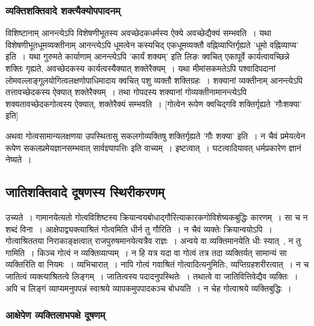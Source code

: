 			\subsubsection{व्यक्तिशक्तिवादे शक्त्यैक्योपपादनम्}

				विशिष्टानाम् आनन्त्येऽपि विशेषणीभूतस्य अवच्छेदकधर्मस्य ऐक्ये अवच्छेद्यैक्यं सम्भवति~। यथा विशेषणीभूतधूमव्यक्तीनाम् आनन्त्येऽपि धूमत्वेन कस्यचिद् एकधूमव्यक्तौ वह्निव्याप्तिर्गृह्यते 'धूमो वह्निव्याप्य' इति~। यथा गुरुमते कार्याणाम् आनन्त्येऽपि 'कार्यं शक्यम्' इति लिङः क्वचित् एकापूर्वे कार्यत्वावच्छिन्ने शक्तिः गृह्यते, अवच्छेदकस्य कार्यत्वस्यैक्यात् शक्तेरैक्यम्~। यथा मीमांसकमतेऽपि पश्वादिपदानां लोमवल्लाङ्गूलयोगित्वलक्षणोपाधिमादाय क्वचित् पशु व्यक्तौ शक्तिग्रहः~। शक्यानां व्यक्तीनाम् आनन्त्येऽपि तत्तावच्छेदकस्य ऐक्यात् शक्तेरैक्यम्~। तथा गोपदस्य शक्यानां गोव्यक्तीनामानन्त्येऽपि शक्यतावच्छेदकगोत्वस्य ऐक्यात्, शक्तेरैक्यं सम्भवति~। [गोत्वेन रूपेण क्वचिद्गवि शक्तिर्गृह्यते 'गौःशक्या' इति] 

				अथवा गोत्वसामान्यलक्षणया उपस्थितासु सकलगोव्यक्तिषु शक्तिर्गृह्यते 'गौः शक्या' इति~। न चैवं प्रमेयत्वेन रूपेण सकलप्रमेयज्ञानसम्भवात् सार्वज्ञ्यापत्तिः इति वाच्यम्~। इष्टत्वात्~। घटत्वादियावत्  धर्मप्रकारेण ज्ञानं नेष्यते~।

		\subsection{जातिशक्तिवादे दूषणस्य स्थिरीकरणम्}

			\begin{small}
				
				उच्यते~। गामानयेत्यतो गोत्वविशिष्टस्य क्रियान्वयबोधाद्गौरित्याकारकगोविशेष्यकबुद्धिः कारणम्~। सा च न शब्दं विना~। आक्षेपाद्व्यक्त्याश्रितं गोत्वमिति धीर्न तु गौरिति~। न चैवं व्यक्तेः क्रियान्वयोऽपि~। गोत्वाश्रिततया निराकाङ्क्षत्वात् राजपुरुषमानयेत्यत्रैव राज्ञः~। अन्वये वा व्यक्तिमानयेति धीः स्यात्~, न तु गामिति~। किञ्च गोत्वं न व्यक्तिव्याप्यम्~। न हि यत्र यदा वा गोत्वं तत्र तदा व्यक्तिर्यत् सामान्यं सा व्यक्तिरिति वा नियमः~। व्यभिचारात्~। नापि गोत्वं गवाश्रितं गोत्वादित्यनुमितिः, व्यप्तिग्रहशरीरत्वात्~। न च जातित्वं व्यक्त्याश्रितत्वे लिङ्गम्~। जातित्वस्य पदादनुपस्थितेः~। तथात्वे वा जातिवित्तिवेद्यैव व्यक्तिः~। अपि च लिङ्गं व्याप्यमनुपपन्नं स्वाश्रये व्यापकमुपपादकञ्च बोधयति~। न चेह गोत्वाश्रये व्यक्तिबुद्धिः~।
			\end{small}
			
			\subsubsection{आक्षेपेण व्यक्तिलाभपक्षे दूषणम्}
				
